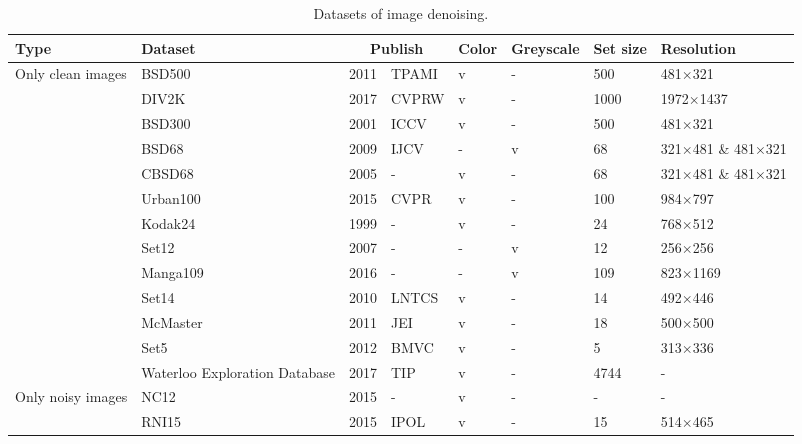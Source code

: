 \documentclass[conference]{IEEEtran}
\begin{document}
\begin{table*}[t]
	\setlength{\abovecaptionskip}{0cm}
	\setlength{\belowcaptionskip}{0cm}
	\caption{Datasets of image denoising.}
	\centering
	\begin{tabular}{m{2.5cm}<{\raggedright}m{2cm}<{\raggedright}m{1.5cm}<{\raggedright}m{2.5cm}<{\raggedright}m{1cm}<{\raggedright}m{1cm}<{\raggedright}m{1cm}<{\raggedright}m{3cm}<{\raggedright}}
		\hline
		Type&Dataset&\multicolumn{2}{c}{Publish}&Color&Greyscale&Set size&Resolution\\
		\hline
		\multirow{13}{*}{Only clean images}&BSD500\cite{arbelaez2010contour}	&2011	&TPAMI&	v	&-	& 500 &	481$\times$321\\
		&DIV2K\cite{agustsson2017ntire}&	2017&	CVPRW&	v	&-	&1000&	1972$\times$1437\\
		&BSD300\cite{martin2001database}&	2001&	ICCV&	v&	-&	500&	481$\times$321\\
		&BSD68\cite{roth2005fields}&	2009&	IJCV&	-&	v&	68&	321$\times$481 \& 481$\times$321\\
		&CBSD68\cite{roth2005fields}	&2005&	-&	v&	-&	68&	321$\times$481 \& 481$\times$321\\
		&Urban100\cite{huang2015single}&	2015&	CVPR&	v&	-&	100&	984$\times$797\\
		&Kodak24\cite{franzen1999kodak}&	1999&	-&	v&	-&	24&	768$\times$512\\
		&Set12\cite{dabov2007image}&	2007&	-&	-&	v&	12&	256$\times$256\\
		&Manga109\cite{aizawa2020building}&	2016&	-&	-&	v&	109&	823$\times$1169\\
		&Set14\cite{zeyde2012single}&	2010&	LNTCS&	v&	-&	14&	492$\times$446\\
		&McMaster\cite{zhang2011color}&	2011&	JEI &	v&	-&	18&	500$\times$500\\
		&Set5\cite{bevilacqua2012low}&	2012&	BMVC&	v&	-&	5&	313$\times$336\\
		&Waterloo Exploration Database\cite{ma2016waterloo}&	2017&	TIP&	v&	-&	4744&	-\\
		\hline
		\multirow{3}{*}{Only noisy images}&	NC12\cite{lebrun2015noise}&	2015&	-&	v&	-	&	- &-\\
		&RNI15\cite{lebrun2015noise}&	2015&	IPOL&	v	&-	&15	&514$\times$465\\

\end{tabular}
\end{table*}
\end{document}
